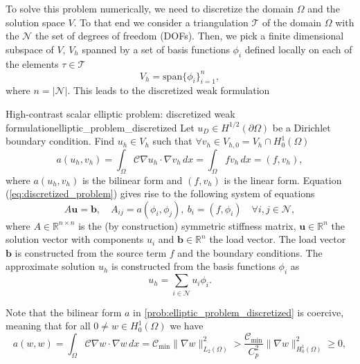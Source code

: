 To solve this problem numerically, we need to discretize the domain $\Omega$ and the solution space $V$. To that end we consider a triangulation $\mathcal{T}$ of the domain $\Omega$ with the $\mathcal{N}$ the set of degrees of freedom (DOFs). Then, we pick a finite dimensional subspace of $V$, $V_h$ spanned by a set of basis functions $\phi_i$ defined locally on each of the elements $\tau \in \mathcal{T}$
\begin{equation*}
  V_h = \text{span}\{\phi_i\}_{i=1}^{n},
\end{equation*}
where $n = |\mathcal{N}|$. This leads to the discretized weak formulation
\begin{fancyprob}{High-contrast scalar elliptic problem: discretized weak formulation}{elliptic_problem_discretized}
    Let $u_D\in H^{1/2}(\partial\Omega)$ be a Dirichlet boundary condition. Find $u_h\in V_h$ such that $\forall v_h \in V_{h,0} = V_h\cap H^1_0(\Omega)$
    \begin{equation}
        a(u_h, v_h) = \int_\Omega \mathcal{C}\nabla u_h\cdot\nabla v_h\,dx = \int_\Omega f v_h \,dx = (f, v_h),
        \label{eq:discretized_problem}
    \end{equation}
    where $a(u_h, v_h)$ is the bilinear form and $(f, v_h)$ is the linear form. Equation (\ref{eq:discretized_problem}) gives rise to the following system of equations
    \begin{equation*}
        A\mathbf{u} = \mathbf{b}, \quad A_{ij} = a(\phi_i, \phi_j), \ b_i = (f, \phi_i) \quad \forall i,j\in\mathcal{N},
    \end{equation*}
    where $A\in\mathbb{R}^{n \times n}$ is the (by construction) symmetric stiffness matrix, $\mathbf{u}\in\mathbb{R}^{n}$ the solution vector with components $u_i$ and $\mathbf{b}\in\mathbb{R}^{n}$ the load vector. The load vector $\mathbf{b}$ is constructed from the source term $f$ and the boundary conditions. The approximate solution $u_h$ is constructed from the basis functions $\phi_i$ as
    \begin{equation*}
        u_h = \sum_{i\in\mathcal{N}} u_i \phi_i.
    \end{equation*}
\end{fancyprob}
Note that the bilinear form $a$ in \cref{prob:elliptic_problem_discretized} is coercive, meaning that for all $0\neq w\in H^1_0(\Omega)$ we have
\begin{equation*}
  a(w,w) = \int_\Omega \mathcal{C} \nabla w\cdot\nabla w\,dx = \mathcal{C}_{\text{min}} \|\nabla w\|_{L_2(\Omega)}^2> \frac{\mathcal{C}_{\text{min}}}{C_p^2}\|\nabla w\|_{H^1_0(\Omega)}^2 \geq 0,
\end{equation*}
